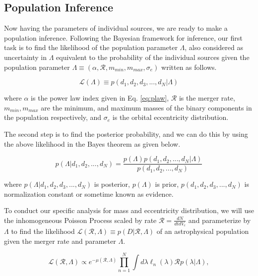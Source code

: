 \documentclass[twocolumn,prd,nofootinbib]{revtex4}
\begin{document}


\subsection{Population Inference}

Now having the parameters of individual sources, we are ready to make a population inference. Following the Bayesian framework for inference, our first task is to find the likelihood of the population parameter $\Lambda$, also considered as uncertainty in $\Lambda$ equivalent to the probability of the individual sources given the population parameter $\Lambda \equiv  (\alpha, \mathcal{R}, m_{min}, m_{max}, \sigma_e)$ written as follows. 

\begin{equation}
\label{eq:likelihood_pop}    
\mathcal{L}(\Lambda)\equiv p(d_1,d_2,d_3,...,d_N|\Lambda)
\end{equation}

where $\alpha$ is the power law index given in Eq. \ref{eq:plaw}, $\mathcal{R}$ is the merger rate, $m_{min}, m_{max}$ are the minimum, and maximum masses of the binary components in the population respectively, and $\sigma_e$ is the orbital eccentricity distribution. 

The second step is to find the posterior probability, and we can do this by using the above likelihood in the Bayes theorem as given below.

\begin{equation}
\label{eq:Bayes}    
p(\Lambda|d_1,d_2,...,d_N)= \frac{p(\Lambda)p(d_1,d_2,...,d_N|\Lambda)}{p(d_1,d_2,...,d_N)}
\end{equation}

where $p(\Lambda|d_1,d_2,d_3,...,d_N)$ is posterior, $p(\Lambda)$ is prior, $p(d_1,d_2,d_3,...,d_N)$ is normalization constant or sometime known as evidence.

To conduct our specific analysis for mass and eccentricity distribution, we will use the inhomogeneous Poisson Process scaled by rate $\mathcal{R} = \frac{dN}{dtdV_c}$ and parameterize by $\Lambda$ to find the likelihood  $\mathcal{L}(\mathcal{R},\Lambda)\equiv p(D|\mathcal{R},\Lambda)$ of an astrophysical population given the merger rate and parameter $\Lambda$. 

\begin{equation}
\label{eq: likelihood}
\mathcal{L}(\mathcal{R},\Lambda) \propto e^{-\mu(\mathcal{R},\Lambda)}\prod_{n=1}^N\int d\lambda \ell_n(\lambda) \mathcal{R} p(\lambda|\Lambda),
\end{equation}
\end{document}
